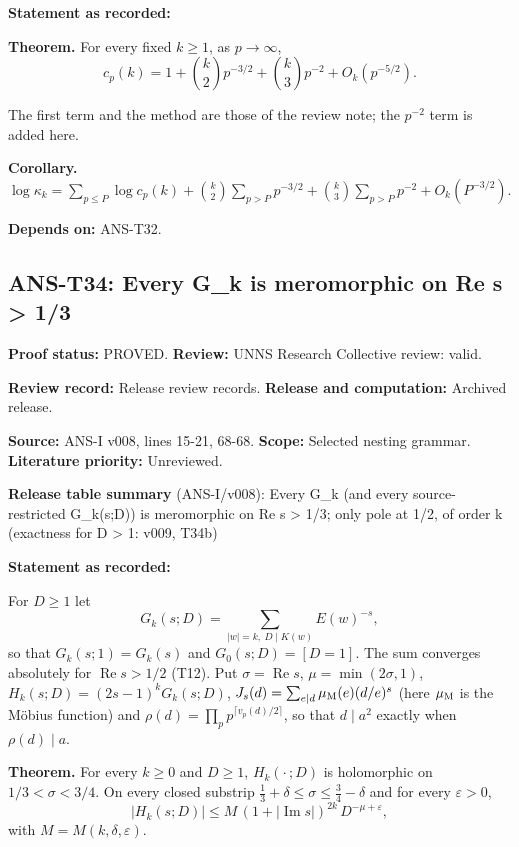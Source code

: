 \documentclass[
  11pt,
]{article}
\begin{document}
\textbf{Statement as recorded:}

\textbf{Theorem.} For every fixed \(k\ge1\), as \(p\to\infty\),
\[c_p(k)=1+\binom k2p^{-3/2}+\binom k3p^{-2}+O_k(p^{-5/2}).\]

The first term and the method are those of the review note; the
\(p^{-2}\) term is added here.

\textbf{Corollary.}
\(\displaystyle\log\kappa_k=\sum_{p\le P}\log c_p(k)+\binom k2\sum_{p>P}p^{-3/2}+\binom k3\sum_{p>P}p^{-2}+O_k(P^{-3/2}).\)

\textbf{Depends on:} ANS-T32.

\hypertarget{ans-t34-every-g_k-is-meromorphic-on-re-s-13}{%
\subsection{ANS-T34: Every G\_k is meromorphic on Re s \textgreater{}
1/3}\label{ans-t34-every-g_k-is-meromorphic-on-re-s-13}}

\textbf{Proof status:} PROVED. \textbf{Review:} UNNS Research Collective
review: valid.

\textbf{Review record:} Release review records. \textbf{Release and
computation:} Archived release.

\textbf{Source:} ANS-I v008, lines 15-21, 68-68. \textbf{Scope:}
Selected nesting grammar. \textbf{Literature priority:} Unreviewed.

\textbf{Release table summary} (ANS-I/v008): Every G\_k (and every
source-restricted G\_k(s;D)) is meromorphic on Re s \textgreater{} 1/3;
only pole at 1/2, of order k (exactness for D \textgreater{} 1: v009,
T34b)

\textbf{Statement as recorded:}

For \(D\ge1\) let \[G_k(s;D)=\sum_{|w|=k,\ D\mid K(w)}E(w)^{-s},\] so
that \(G_k(s;1)=G_k(s)\) and \(G_0(s;D)=[D=1]\). The sum converges
absolutely for \(\operatorname{Re}s>1/2\) (T12). Put
\(\sigma=\operatorname{Re}s\), \(\mu=\min(2\sigma,1)\),
\(H_k(s;D)=(2s-1)^kG_k(s;D)\),
\(J_s(d)=\sum_{e\mid d}\mu_{\rm M}(e)(d/e)^s\) (here \(\mu_{\rm M}\) is
the Möbius function) and \(\rho(d)=\prod_pp^{\lceil v_p(d)/2\rceil}\),
so that \(d\mid a^2\) exactly when \(\rho(d)\mid a\).

\textbf{Theorem.} For every \(k\ge0\) and \(D\ge1\), \(H_k(\cdot\,;D)\)
is holomorphic on \(1/3<\sigma<3/4\). On every closed substrip
\(\frac13+\delta\le\sigma\le\frac34-\delta\) and for every
\(\varepsilon>0\),
\[|H_k(s;D)|\le M\,(1+|\operatorname{Im}s|)^{2k}\,D^{-\mu+\varepsilon},\]
with \(M=M(k,\delta,\varepsilon)\).
\end{document}
